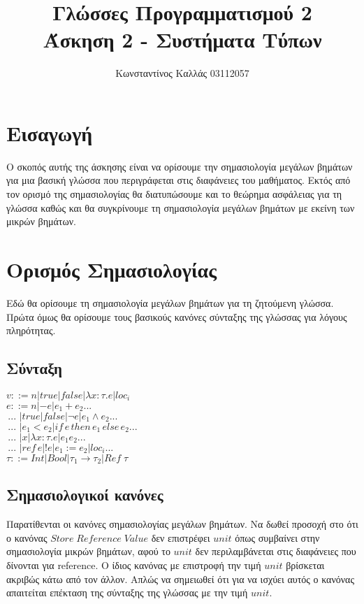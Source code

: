 \documentclass[a4paper]{article}
\title{ \textbf{Γλώσσες Προγραμματισμού 2} \\ Άσκηση 2 - Συστήματα Τύπων}
\author{Κωνσταντίνος Καλλάς 03112057}
\begin{document}
\maketitle


\section*{Εισαγωγή}

Ο σκοπός αυτής της άσκησης είναι να ορίσουμε την σημασιολογία μεγάλων βημάτων για μια βασική γλώσσα που περιγράφεται στις διαφάνειες του μαθήματος. Εκτός από τον ορισμό της σημασιολογίας θα διατυπώσουμε και το θεώρημα ασφάλειας για τη γλώσσα καθώς και θα συγκρίνουμε τη σημασιολογία μεγάλων βημάτων με εκείνη των μικρών βημάτων. 

\section*{Ορισμός Σημασιολογίας}

Εδώ θα ορίσουμε τη σημασιολογία μεγάλων βημάτων για τη ζητούμενη γλώσσα. Πρώτα όμως θα ορίσουμε τους βασικούς κανόνες σύνταξης της γλώσσας για λόγους πληρότητας.

\subsection*{Σύνταξη}

\(v ::= n | true | false | \lambda x: \tau.e | loc_i\) \\
\(e ::= n | -e | e_1 + e_2 ...\) \\
\( \, ... \, \, | true | false | \neg e | e_1 \wedge e_2 ... \) \\
\( \, ... \, \, | e_1 < e_2 | if \, e \, then \, e_1 \, else \, e_2 ... \) \\
\( \, ... \, \, | x | \lambda x: \tau.e | e_1e_2 ... \) \\
\( \, ... \, \, | ref \, e | ! e | e_1 := e_2 | loc_i ... \) \\
\(\tau ::= Int | Bool | \tau_1 \rightarrow \tau_2 | Ref \; \tau \)

\subsection*{Σημασιολογικοί κανόνες}
Παρατίθενται οι κανόνες σημασιολογίας μεγάλων βημάτων. Να δωθεί προσοχή στο ότι ο κανόνας \(Store \; Reference \; Value\) δεν επιστρέφει \(unit\) όπως συμβαίνει στην σημασιολογία μικρών βημάτων, αφού το \(unit\) δεν περιλαμβάνεται στις διαφάνειες που δίνονται για \foreignlanguage{english}{reference}. Ο ίδιος κανόνας με επιστροφή την τιμή \(unit\) βρίσκεται ακριβώς κάτω από τον άλλον. Απλώς να σημειωθεί ότι για να ισχύει αυτός ο κανόνας απαιτείται επέκταση της σύνταξης της γλώσσας με την τιμή \(unit\). 
 
\end{document}
